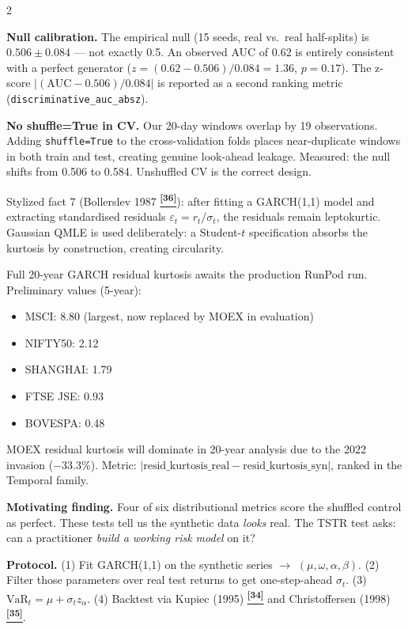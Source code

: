 \documentclass[10pt]{article}
\newcommand{\navybox}[2]{\begin{tcolorbox}[mybox={Navy}{LBg},title={#1}]#2\end{tcolorbox}}
\newcommand{\purplebox}[2]{\begin{tcolorbox}[mybox={Purple}{LBg},title={#1}]#2\end{tcolorbox}}
\newcommand{\tcite}[1]{%
  \hyperlink{R:#1}{\textsuperscript{\scriptsize\textbf{[#1]}}}}
\begin{document}
\begin{multicols}{2}
{\medskip
\textbf{Null calibration.} The empirical null (15 seeds, real vs.\ real half-splits) is $0.506 \pm 0.084$ --- not exactly 0.5. An observed AUC of 0.62 is entirely consistent with a perfect generator ($z = (0.62 - 0.506)/0.084 = 1.36$, $p = 0.17$). The z-score $|(\text{AUC} - 0.506)/0.084|$ is reported as a second ranking metric (\texttt{discriminative\_auc\_absz}).

\medskip
\textbf{No shuffle=True in CV.} Our 20-day windows overlap by 19 observations. Adding \texttt{shuffle=True} to the cross-validation folds places near-duplicate windows in both train and test, creating genuine look-ahead leakage. Measured: the null shifts from 0.506 to 0.584. Unshuffled CV is the correct design.}

\columnbreak

\purplebox{Conditional Heavy Tails}{%
Stylized fact 7 (Bollerslev 1987\tcite{36}): after fitting a GARCH(1,1) model and extracting standardised residuals $\varepsilon_t = r_t / \sigma_t$, the residuals remain leptokurtic. Gaussian QMLE is used deliberately: a Student-$t$ specification absorbs the kurtosis by construction, creating circularity.

Full 20-year GARCH residual kurtosis awaits the production RunPod run. Preliminary values (5-year):
\begin{itemize}[noitemsep,topsep=1pt]
  \item MSCI: 8.80 (largest, now replaced by MOEX in evaluation)
  \item NIFTY50: 2.12
  \item SHANGHAI: 1.79
  \item FTSE JSE: 0.93
  \item BOVESPA: 0.48
\end{itemize}

MOEX residual kurtosis will dominate in 20-year analysis due to the 2022 invasion ($-33.3\%$). Metric: $|\text{resid\_kurtosis\_real} - \text{resid\_kurtosis\_syn}|$, ranked in the Temporal family.}

\navybox{Downstream Utility: TSTR Protocol}{%
\textbf{Motivating finding.} Four of six distributional metrics score the shuffled control as perfect. These tests tell us the synthetic data \emph{looks} real. The TSTR test asks: can a practitioner \emph{build a working risk model} on it?

\textbf{Protocol.} (1) Fit GARCH(1,1) on the synthetic series $\to$ $(\mu, \omega, \alpha, \beta)$. (2) Filter those parameters over real test returns to get one-step-ahead $\sigma_t$. (3) $\text{VaR}_t = \mu + \sigma_t z_\alpha$. (4) Backtest via Kupiec (1995)\tcite{34} and Christoffersen (1998)\tcite{35}.

}
\end{multicols}
\end{document}
